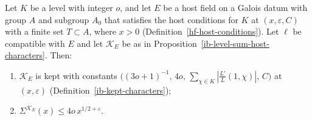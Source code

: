 \begin{lemma}\label{ib-host-kept-characters}
Let $K$ be a level with integer $o$, and let $E$ be a host field on a Galois datum with
group $A$ and subgroup $A_0$ that satisfies the host conditions for $K$ at
$(x,\varepsilon,C)$ with a finite set $T\subset A$, where $x>0$
(Definition~\ref{hf-host-conditions}). Let $\ell$ be compatible with $E$ and
let $\mathcal K_E$ be as in Proposition~\ref{ib-level-sum-host-characters}. Then:
\begin{enumerate}
\item $\mathcal K_E$ is kept with constants
  $\bigl((3o+1)^{-1},\,4o,\,\sum_{\chi\in K}|\tfrac{L'}{L}(1,\chi)|,\,C\bigr)$ at
  $(x,\varepsilon)$ (Definition~\ref{ib-kept-characters});
\item $\Sigma^{\mathcal K_E}(x)\leq4o\,x^{1/2+\varepsilon}$.
\end{enumerate}
\end{lemma}
